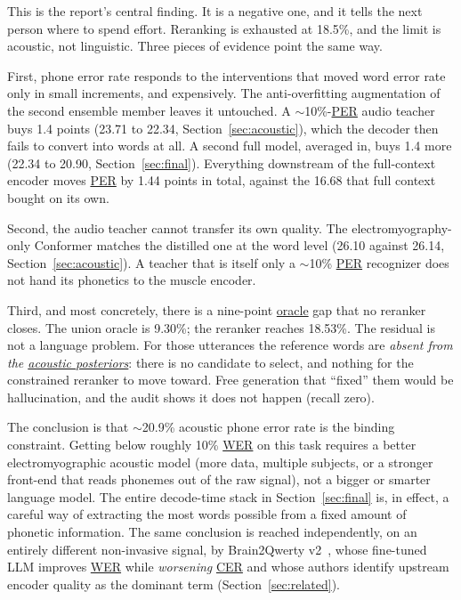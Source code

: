 \documentclass{article}
\DeclareRobustCommand{\glref}[2]{\hyperlink{gl:#1}{\textcolor{glosslink}{#2}}}
\DeclareRobustCommand{\wer}{\glref{wer}{WER}}
\DeclareRobustCommand{\per}{\glref{per}{PER}}
\DeclareRobustCommand{\cer}{\glref{cer}{CER}}
\begin{document}
This is the report's central finding. It is a negative one, and it tells the next person where to
spend effort. Reranking is exhausted at 18.5\%, and the limit is acoustic, not linguistic.
Three pieces of evidence point the same way.

First, phone error rate responds to the interventions that moved word error rate only in small
increments, and expensively. The anti-overfitting augmentation of the second ensemble member leaves it
untouched. A $\sim$10\%-\per{} audio teacher buys 1.4 points (23.71 to 22.34,
Section~\ref{sec:acoustic}), which the decoder then fails to convert into words at all. A second full
model, averaged in, buys 1.4 more (22.34 to 20.90, Section~\ref{sec:final}). Everything downstream of
the full-context encoder moves \per{} by 1.44 points in total, against the 16.68 that full context
bought on its own.

Second, the audio teacher cannot transfer its own quality. The electromyography-only Conformer matches
the distilled one at the word level (26.10 against 26.14, Section~\ref{sec:acoustic}). A teacher that
is itself only a $\sim$10\% \per{} recognizer does not hand its phonetics to the muscle encoder.

Third, and most concretely, there is a nine-point \glref{oracle}{oracle} gap that no reranker closes.
The union oracle is 9.30\%; the reranker reaches 18.53\%. The residual is not a language problem. For
those utterances the reference words are \emph{absent from the
\glref{posterior}{acoustic posteriors}}: there is no candidate to select, and nothing for the
constrained reranker to move toward. Free generation that ``fixed'' them would be hallucination, and
the audit shows it does not happen (recall zero).

The conclusion is that $\sim$20.9\% acoustic phone error rate is the binding constraint. Getting below
roughly 10\% \wer{} on this task requires a better electromyographic acoustic model (more data,
multiple subjects, or a stronger front-end that reads phonemes out of the raw signal), not a bigger or
smarter language model. The entire decode-time stack in Section~\ref{sec:final} is, in effect, a
careful way of extracting the most words possible from a fixed amount of phonetic information. The
same conclusion is reached independently, on an entirely different non-invasive signal, by
Brain2Qwerty v2~\citep{zhang2026brain2qwerty2}, whose fine-tuned LLM improves \wer{} while
\emph{worsening} \cer{} and whose authors identify upstream encoder quality as the dominant term
(Section~\ref{sec:related}).
\end{document}
